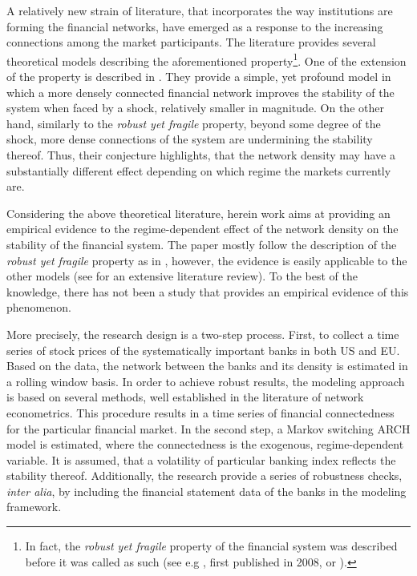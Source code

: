 \documentclass[12pt]{article}
\begin{document}
A relatively new strain of literature, that incorporates the way institutions are forming the financial networks, have emerged as a response to the increasing connections among the market participants. The literature provides several theoretical models describing the aforementioned property\footnote{In fact, the \textit{robust yet fragile} property of the financial system was described before it was called as such (see e.g \cite{gai10}, first published in 2008, or \cite{gallegati08}).}. One of the extension of the property is described in \cite{acemoglu13}. They provide a simple, yet profound model in which a more densely connected financial network improves the stability of the system when faced by a shock, relatively smaller in magnitude. On the other hand, similarly to the \textit{robust yet fragile} property, beyond some degree of the shock, more dense connections of the system are undermining the stability thereof. Thus, their conjecture highlights, that the network density may have a substantially different effect depending on which regime the markets currently are. 

Considering the above theoretical literature, herein work aims at providing an empirical evidence to the regime-dependent effect of the network density on the stability of the financial system. The paper mostly follow the description of the \textit{robust yet fragile} property as in \cite{acemoglu13}, however, the evidence is easily applicable to the other models (see \cite{glasserman16} for an extensive literature review). To the best of the knowledge, there has not been a study that provides an empirical evidence of this phenomenon.

More precisely, the research design is a two-step process. First, to collect a time series of stock prices of the systematically important banks in both US and EU. Based on the data, the network between the banks and its density is estimated in a rolling window basis. In order to achieve robust results, the modeling approach is based on several methods, well established in the literature of network econometrics. This procedure results in a time series of financial connectedness for the particular financial market. In the second step, a Markov switching ARCH model is estimated, where the connectedness is the exogenous, regime-dependent variable. It is assumed, that a volatility of particular banking index reflects the stability thereof. Additionally, the research provide a series of robustness checks, \textit{inter alia}, by including the financial statement data of the banks in the modeling framework.
\end{document}
